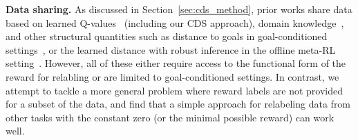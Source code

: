 \textbf{Data sharing.} 
As discussed in Section~\ref{sec:cds_method}, prior works share data based on learned Q-values~\citep{eysenbach2020rewriting,li2020generalized} (including our CDS approach), domain knowledge~\citep{kalashnikov2021mt}, and other structural quantities such as distance to goals in goal-conditioned settings~\citep{andrychowicz2017hindsight,liu2019competitive,sun2019policy,lin2019reinforcement,chebotar2021actionable}, or the learned distance with robust inference in the offline meta-RL setting~\citep{li2019multi}. However, all of these either require access to the functional form of the reward for relabling or are limited to goal-conditioned settings. In contrast, we attempt to tackle a more general problem where reward labels are not provided for a subset of the data, and find that a simple approach for relabeling data from other tasks with the constant zero (or the minimal possible reward) can work well. 
